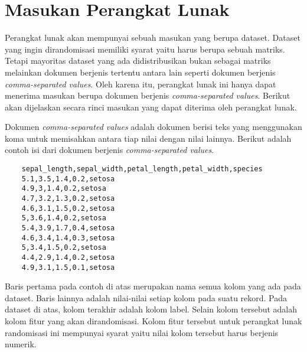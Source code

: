 \section{Masukan Perangkat Lunak}
\label{sec:masukan-pl}

Perangkat lunak akan mempunyai sebuah masukan yang berupa dataset. Dataset yang ingin dirandomisasi memiliki syarat yaitu harus berupa sebuah matriks. Tetapi mayoritas dataset yang ada didistribusikan bukan sebagai matriks melainkan dokumen berjenis tertentu antara lain seperti dokumen berjenis \textit{comma-separated values}. Oleh karena itu, perangkat lunak ini hanya dapat menerima masukan berupa dokumen berjenis \textit{comma-separated values}. Berikut akan dijelaskan secara rinci masukan yang dapat diterima oleh perangkat lunak.

Dokumen \textit{comma-separated values} adalah dokumen berisi teks yang menggunakan koma untuk memisahkan antara tiap nilai dengan nilai lainnya. Berikut adalah contoh isi dari dokumen berjenis \textit{comma-separated values}.
\begin{verbatim}
	sepal_length,sepal_width,petal_length,petal_width,species
	5.1,3.5,1.4,0.2,setosa
	4.9,3,1.4,0.2,setosa
	4.7,3.2,1.3,0.2,setosa
	4.6,3.1,1.5,0.2,setosa
	5,3.6,1.4,0.2,setosa
	5.4,3.9,1.7,0.4,setosa
	4.6,3.4,1.4,0.3,setosa
	5,3.4,1.5,0.2,setosa
	4.4,2.9,1.4,0.2,setosa
	4.9,3.1,1.5,0.1,setosa
\end{verbatim}
Baris pertama pada contoh di atas merupakan nama semua kolom yang ada pada dataset. Baris lainnya adalah nilai-nilai setiap kolom pada suatu rekord. Pada dataset di atas, kolom terakhir adalah kolom label. Selain kolom tersebut adalah kolom fitur yang akan dirandomisasi. Kolom fitur tersebut untuk perangkat lunak randomisasi ini mempunyai syarat yaitu nilai kolom tersebut harus berjenis numerik.

